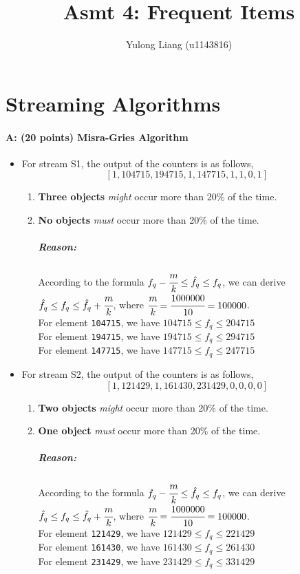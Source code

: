 \documentclass[11pt]{article}
\title{Asmt 4: Frequent Items}
\author{Yulong Liang (u1143816)}
\begin{document}
\maketitle

\section{Streaming Algorithms}

\paragraph{A: (20 points) Misra-Gries Algorithm}
\begin{itemize}
\item For stream S1, the output of the counters is as follows,
$$[1, 104715, 194715, 1, 147715, 1, 1, 0, 1]$$
\begin{enumerate}
\item \textbf{Three objects} \textit{might} occur more than 20\% of the time.
\item \textbf{No objects} \textit{must} occur more than 20\% of the time.
\subparagraph{Reason: }
According to the formula $f_q-\cfrac{m}{k}\le\hat{f_q}\le f_q$, we can derive $\hat{f_q}\le f_q\le \hat{f_q}+\cfrac{m}{k}$, where $\cfrac{m}{k}=\cfrac{1000000}{10}=100000$.\\
For element \texttt{104715}, we have $104715\le f_q\le 204715$\\
For element \texttt{194715}, we have $194715\le f_q\le 294715$\\
For element \texttt{147715}, we have $147715\le f_q\le 247715$\\
\end{enumerate}

\item For stream S2, the output of the counters is as follows,
$$[1, 121429, 1, 161430, 231429, 0, 0, 0, 0]$$
\begin{enumerate}
\item \textbf{Two objects} \textit{might} occur more than 20\% of the time.
\item \textbf{One object} \textit{must} occur more than 20\% of the time.
\subparagraph{Reason:}
According to the formula $f_q-\cfrac{m}{k}\le\hat{f_q}\le f_q$, we can derive $\hat{f_q}\le f_q\le \hat{f_q}+\cfrac{m}{k}$, where $\cfrac{m}{k}=\cfrac{1000000}{10}=100000$.\\
For element \texttt{121429}, we have $121429\le f_q\le 221429$\\
For element \texttt{161430}, we have $161430\le f_q\le 261430$\\
For element \texttt{231429}, we have $231429\le f_q\le 331429$\\
\end{enumerate}
\end{itemize}
\end{document}
